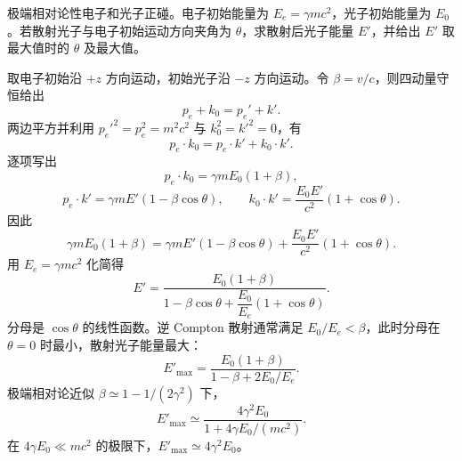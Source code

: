 \begin{question}[极端相对论电子与光子的正碰]
极端相对论性电子和光子正碰。电子初始能量为 $E_e=\gamma mc^2$，光子初始能量为 $E_0$。若散射光子与电子初始运动方向夹角为 $\theta$，求散射后光子能量 $E'$，并给出 $E'$ 取最大值时的 $\theta$ 及最大值。
\begin{solution}
取电子初始沿 $+z$ 方向运动，初始光子沿 $-z$ 方向运动。令 $\beta=v/c$，则四动量守恒给出
\[
  p_e+k_0=p_e'+k' .
\]
两边平方并利用 $p_e'^2=p_e^2=m^2c^2$ 与 $k_0^2=k'^2=0$，有
\[
  p_e\cdot k_0=p_e\cdot k'+k_0\cdot k' .
\]
逐项写出
\[
  p_e\cdot k_0=\gamma mE_0(1+\beta),
\]
\[
  p_e\cdot k'=\gamma mE'(1-\beta\cos\theta),
  \qquad
  k_0\cdot k'=\frac{E_0E'}{c^2}(1+\cos\theta) .
\]
因此
\[
  \gamma mE_0(1+\beta)
  =\gamma mE'(1-\beta\cos\theta)+\frac{E_0E'}{c^2}(1+\cos\theta) .
\]
用 $E_e=\gamma mc^2$ 化简得
\[
  \boxed{
  E'=\frac{E_0(1+\beta)}{1-\beta\cos\theta+\dfrac{E_0}{E_e}(1+\cos\theta)} } .
\]
分母是 $\cos\theta$ 的线性函数。逆 Compton 散射通常满足 $E_0/E_e<\beta$，此时分母在 $\theta=0$ 时最小，散射光子能量最大：
\[
  E'_{\max}=\frac{E_0(1+\beta)}{1-\beta+2E_0/E_e} .
\]
极端相对论近似 $\beta\simeq1-1/(2\gamma^2)$ 下，
\[
  \boxed{E'_{\max}\simeq
  \frac{4\gamma^2E_0}{1+4\gamma E_0/(mc^2)}} .
\]
在 $4\gamma E_0\ll mc^2$ 的极限下，$E'_{\max}\simeq4\gamma^2E_0$。
\end{solution}
\end{question}


